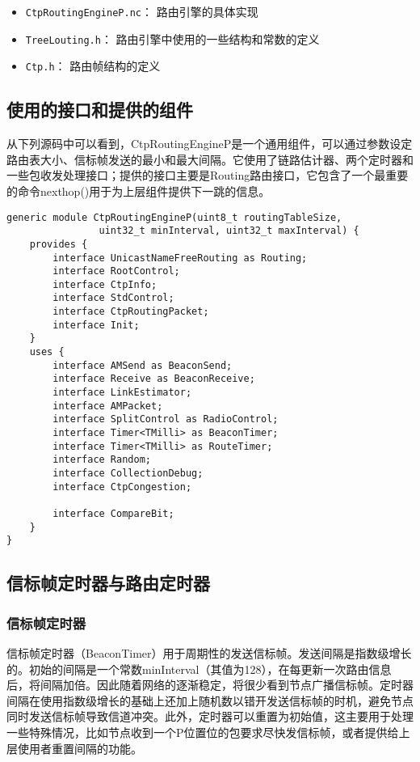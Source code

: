 \vspace{-10pt}
\begin{itemize}
	\item \texttt{CtpRoutingEngineP.nc}： 路由引擎的具体实现
	\item \texttt{TreeLouting.h}： 路由引擎中使用的一些结构和常数的定义
	\item \texttt{Ctp.h}： 路由帧结构的定义
\end{itemize}
\vspace{-10pt}

\subsection{使用的接口和提供的组件}
从下列源码中可以看到，CtpRoutingEngineP是一个通用组件，可以通过参数设定路由表大小、信标帧发送的最小和最大间隔。它使用了链路估计器、两个定时器和一些包收发处理接口；提供的接口主要是Routing路由接口，它包含了一个最重要的命令nexthop()用于为上层组件提供下一跳的信息。

\begin{lstlisting}
generic module CtpRoutingEngineP(uint8_t routingTableSize, 
				uint32_t minInterval, uint32_t maxInterval) {
	provides {
		interface UnicastNameFreeRouting as Routing;
		interface RootControl;
		interface CtpInfo;
		interface StdControl;
		interface CtpRoutingPacket;
		interface Init;
	} 
	uses {
		interface AMSend as BeaconSend;
		interface Receive as BeaconReceive;
		interface LinkEstimator;
		interface AMPacket;
		interface SplitControl as RadioControl;
		interface Timer<TMilli> as BeaconTimer;
		interface Timer<TMilli> as RouteTimer;
		interface Random;
		interface CollectionDebug;
		interface CtpCongestion;

		interface CompareBit;
	}
}
\end{lstlisting}

\subsection{信标帧定时器与路由定时器}
	\subsubsection{信标帧定时器}
	信标帧定时器（BeaconTimer）用于周期性的发送信标帧。发送间隔是指数级增长的。初始的间隔是一个常数minInterval（其值为128），在每更新一次路由信息后，将间隔加倍。因此随着网络的逐渐稳定，将很少看到节点广播信标帧。定时器间隔在使用指数级增长的基础上还加上随机数以错开发送信标帧的时机，避免节点同时发送信标帧导致信道冲突。此外，定时器可以重置为初始值，这主要用于处理一些特殊情况，比如节点收到一个P位置位的包要求尽快发信标帧，或者提供给上层使用者重置间隔的功能。
